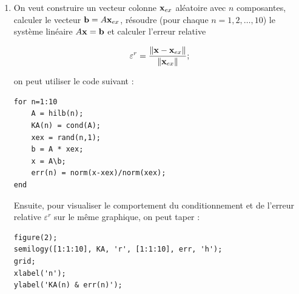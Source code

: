 \begin{enumerate}[label=\alph*)]
      \item On veut construire un vecteur colonne $\mathbf{x}_{e x}$ aléatoire avec $n$ composantes, calculer le vecteur $\mathbf{b} = A \mathbf{x}_{e x}$, résoudre (pour chaque $n = 1, 2, \dots , 10$) le système linéaire $A \mathbf{x} = \mathbf{b}$ et calculer l'erreur relative

      \begin{equation*}
        \varepsilon^{r} = \dfrac{\left\lVert\mathbf{x} - \mathbf{x}_{e x}\right\rVert}{\left\lVert\mathbf{x}_{e x}\right\rVert};
      \end{equation*}
      
      on peut utiliser le code suivant :
      
\begin{verbatim}
for n=1:10
    A = hilb(n);
    KA(n) = cond(A);
    xex = rand(n,1);
    b = A * xex;
    x = A\b;
    err(n) = norm(x-xex)/norm(xex);
end
\end{verbatim}

    Ensuite, pour visualiser le comportement du conditionnement et de l'erreur relative $\varepsilon^{r}$ sur le même graphique, on peut taper :
    
\begin{verbatim}
figure(2);
semilogy([1:1:10], KA, 'r', [1:1:10], err, 'h');
grid;
xlabel('n');
ylabel('KA(n) & err(n)');
\end{verbatim}


\end{enumerate}

